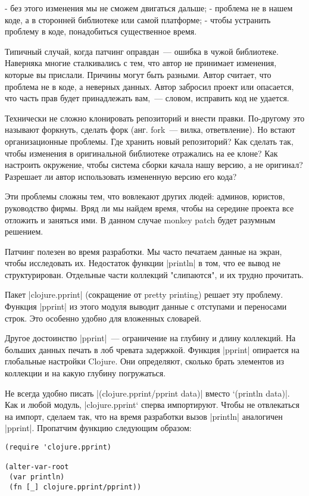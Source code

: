 - без этого изменения мы не сможем двигаться дальше;
- проблема не в нашем коде, а в сторонней библиотеке или самой платформе;
- чтобы устранить проблему в коде, понадобиться существенное время.

Типичный случай, когда патчинг оправдан~--- ошибка в чужой библиотеке. Наверняка
многие сталкивались с тем, что автор не принимает изменения, которые вы
прислали. Причины могут быть разными. Автор считает, что проблема не в коде, а
неверных данных. Автор забросил проект или опасается, что часть прав будет
принадлежать вам,~--- словом, исправить код не удается.

Технически не сложно клонировать репозиторий и внести правки. По-другому это
называют форкнуть, сделать форк (анг. fork~--- вилка, ответвление). Но встают
организационные проблемы. Где хранить новый репозиторий? Как сделать так, чтобы
изменения в оригинальной библиотеке отражались на ее клоне? Как настроить
окружение, чтобы система сборки качала нашу версию, а не оригинал? Разрешает ли
автор использовать измененную версию его кода?

Эти проблемы сложны тем, что вовлекают других людей: админов, юристов,
руководство фирмы. Вряд ли мы найдем время, чтобы на середине проекта все
отложить и заняться ими. В данном случае monkey patch будет разумным решением.

Патчинг полезен во время разработки. Мы часто печатаем данные на экран, чтобы
исследовать их. Недостаток функции \spverb|println| в том, что ее вывод не
структурирован. Отдельные части коллекций "слипаются", и их трудно прочитать.

Пакет \spverb|clojure.pprint| (сокращение от pretty printing) решает эту
проблему. Функция \spverb|pprint| из этого модуля выводит данные с отступами и
переносами строк. Это особенно удобно для вложенных словарей.

Другое достоинство \spverb|pprint|~--- ограничение на глубину и длину коллекций. На
больших данных печать в лоб чревата задержкой. Функция \spverb|pprint| опирается на
глобальные настройки Clojure. Они определяют, сколько брать элементов из
коллекции и на какую глубину погружаться.

Не всегда удобно писать \spverb|(clojure.pprint/pprint data)| вместо `(println
data)\spverb|. Как и любой модуль, |clojure.pprint` сперва импортируют. Чтобы не
отвлекаться на импорт, сделаем так, что на время разработки вызов \spverb|println|
аналогичен \spverb|pprint|. Пропатчим функцию следующим образом:

\begin{verbatim}
(require 'clojure.pprint)

(alter-var-root
 (var println)
 (fn [_] clojure.pprint/pprint))
\end{verbatim}

